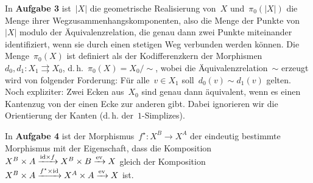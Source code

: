 \documentclass{uebblatt}
\begin{document}
In \textbf{Aufgabe 3} ist~$|X|$ die geometrische Realisierung von~$X$
und~$\pi_0(|X|)$ die Menge ihrer Wegzusammenhangskomponenten, also die Menge
der Punkte von~$|X|$ modulo der Äquivalenzrelation, die genau dann zwei Punkte
miteinander identifiziert, wenn sie durch einen stetigen Weg verbunden werden
können. Die Menge~$\pi_0(X)$ ist definiert als der Kodifferenzkern der
Morphismen~$d_0, d_1 : X_1 \rightrightarrows X_0$, d.\,h.~$\pi_0(X) =
X_0/{\sim}$, wobei die Äquivalenzrelation~$\sim$ erzeugt wird von folgender
Forderung: Für alle~$v \in X_1$ soll~$d_0(v) \sim d_1(v)$ gelten. Noch
expliziter: Zwei Ecken aus~$X_0$ sind genau dann äquivalent, wenn es einen
Kantenzug von der einen Ecke zur anderen gibt. Dabei ignorieren wir die
Orientierung der Kanten (d.\,h. der~$1$-Simplizes).

In \textbf{Aufgabe 4} ist der Morphismus~$f^\star : X^B \to X^A$ der eindeutig
bestimmte Morphismus mit der Eigenschaft, dass die Komposition~$X^B \times A
\xrightarrow{\mathrm{id} \times f} X^B \times B \xrightarrow{\mathrm{ev}} X$ gleich der
Komposition~$X^B \times A \xrightarrow{f^\star \times \mathrm{id}} X^A \times A
\xrightarrow{\mathrm{ev}} X$ ist. 
\end{document}
